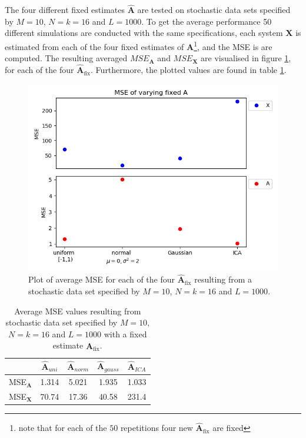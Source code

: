 The four different fixed estimates $\hat{\mathbf{A}}$ are tested on stochastic data sets specified by $M = 10$, $N = k = 16$ and $L = 1000$. 
To get the average performance 50 different simulations are conducted with the same specifications, each system $\textbf{X}$ is estimated from each of the four fixed estimates of $\textbf{A}$\footnote{note that for each of the $50$ repetitions  four new $\hat{\textbf{A}}_{\text{fix}}$ are fixed}, and the MSE is are computed. The resulting averaged $MSE_{\textbf{A}}$ and $MSE_{\textbf{X}}$ are visualised  in figure \ref{fig:vary_A}, for each of the four $\hat{\mathbf{A}}_{\text{fix}}$. 
Furthermore, the plotted values are found in table \ref{tab:fixed}.

\begin{figure}[H]
\centering
\includegraphics[scale=0.5]{figures/ch_6/A_fix.png}
\caption{Plot of average MSE for each of the four $\hat{\mathbf{A}}_{\text{fix}}$ resulting from a stochastic data set specified by $M=10$, $N=k=16$ and $L=1000$.}
\label{fig:vary_A}
\end{figure}
\noindent

\begin{table}[H]
\centering
\begin{tabular}{|c|c|c|c|c|}
\hline
 & $\hat{\textbf{A}}_{uni}$ & $\hat{\textbf{A}}_{norm}$	 & $\hat{\textbf{A}}_{gauss}$ & $\hat{\textbf{A}}_{ICA}$ \\
\hline
MSE$_\mathbf{A}$ & 1.314 & 5.021 & 1.935 & 1.033 \\
\hline
MSE$_\mathbf{X}$ & 70.74 & 17.36 & 40.58 & 231.4 \\
\hline
\end{tabular}
\caption{Average MSE values resulting from stochastic data set specified by $M=10$, $N=k=16$ and $L=1000$ with a fixed estimate $\hat{\mathbf{A}}_{\text{fix}}$.}
\label{tab:fixed}
\end{table}


